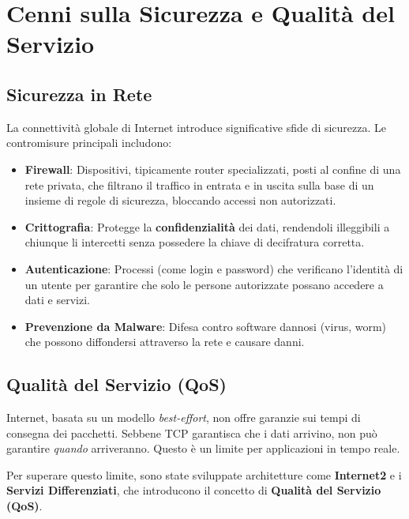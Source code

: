 \section{Cenni sulla Sicurezza e Qualità del Servizio}
\subsection{Sicurezza in Rete}
La connettività globale di Internet introduce significative sfide di sicurezza. Le contromisure principali includono:
\begin{itemize}
    \item \textbf{Firewall}: Dispositivi, tipicamente router specializzati, posti al confine di una rete privata, che filtrano il traffico in entrata e in uscita sulla base di un insieme di regole di sicurezza, bloccando accessi non autorizzati.
    \item \textbf{Crittografia}: Protegge la \textbf{confidenzialità} dei dati, rendendoli illeggibili a chiunque li intercetti senza possedere la chiave di decifratura corretta.
    \item \textbf{Autenticazione}: Processi (come login e password) che verificano l'identità di un utente per garantire che solo le persone autorizzate possano accedere a dati e servizi.
    \item \textbf{Prevenzione da Malware}: Difesa contro software dannosi (virus, worm) che possono diffondersi attraverso la rete e causare danni.
\end{itemize}

\subsection{Qualità del Servizio (QoS)}
Internet, basata su un modello \textit{best-effort}, non offre garanzie sui tempi di consegna dei pacchetti. Sebbene TCP garantisca che i dati arrivino, non può garantire \textit{quando} arriveranno. Questo è un limite per applicazioni in tempo reale.

Per superare questo limite, sono state sviluppate architetture come \textbf{Internet2} e i \textbf{Servizi Differenziati}, che introducono il concetto di \textbf{Qualità del Servizio (QoS)}.


